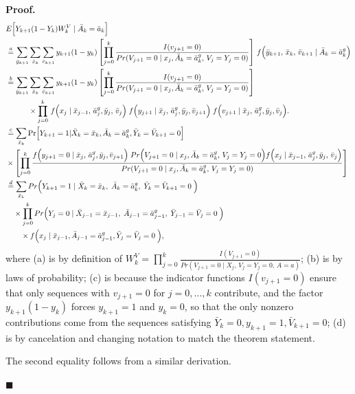 \textbf{Proof.} 
\begin{align*}
&E\Bigl[Y_{k+1}(1 - Y_k)W_k^V\mid \bar{A}_k=\bar{a}_k\Bigr] \\
&\stackrel{a}{=}\sum_{\bar{y}_{k+1}}\sum_{\bar{x}_k}\sum_{\bar{v}_{k+1}} y_{k+1}(1-y_k)
\left[\prod_{j=0}^k \frac{I(v_{j+1}=0)}{Pr(V_{j+1}=0\mid x_j,\bar{A}_k = \bar{a}^g_k, \,V_j=Y_j=0)}\right] \, f\Bigl(\bar{y}_{k+1},\,\bar{x}_k,\,\bar{v}_{k+1}\mid \bar{A}_k=\bar{a}^g_k\Bigr) \\
&\stackrel{b}{=}\sum_{\bar{y}_{k+1}}\sum_{\bar{x}_k}\sum_{\bar{v}_{k+1}} y_{k+1}(1-y_k)
\left[\prod_{j=0}^k \frac{I(v_{j+1}=0)}{Pr(V_{j+1}=0\mid x_j,\bar{A}_k = \bar{a}^g_k, \,V_j=Y_j=0)}\right] \\
& \quad \quad \quad \times  \prod_{j=0}^k \, f\Bigl(x_j\mid \bar{x}_{j-1},\, \bar{a}^g_j, \bar{y}_j,\,\bar{v}_j \Bigr) \; f\Bigl(y_{j+1}\mid \bar{x}_j,\, \bar{a}^g_j, \bar{y}_j, \bar{v}_{j+1} \Bigr) \; f\Bigl(v_{j+1}\mid \bar{x}_j,\,\bar{a}^g_j, \bar{y}_j, \bar{v}_j \Bigr). \\
&\stackrel{c}{=}\sum_{\bar{x}_k} \Pr\Bigl[ Y_{k+1}=1|\bar{X}_k=\bar{x}_k, \bar{A}_k = \bar{a}^g_k, \bar{Y}_k=\bar{V}_{k+1}=0\Bigr] \\
&\times 
\left[\prod_{j=0}^k \frac{f\Bigl(y_{j+1}=0 \mid \bar{x}_j,\, \bar{a}^g_j, \bar{y}_j, \bar{v}_{j+1} \Bigr) \; Pr\Bigr(V_{j+1}=0\mid x_j,\bar{A}_k = \bar{a}^g_k, \,V_j=Y_j=0\Bigl)f\Bigl(x_j\mid \bar{x}_{j-1},\, \bar{a}^g_j, \bar{y}_j,\,\bar{v}_j \Bigr) }{Pr(V_{j+1}=0\mid x_j,\bar{A}_k = \bar{a}^g_k, \,V_j=Y_j=0)}\right]\\
&\stackrel{d}{=}\sum_{\bar{x}_k} Pr\Bigl(Y_{k+1} = 1\mid \bar{X}_k = \bar{x}_k,\; \bar{A}_k = \bar{a}^g_k,\; \bar{Y}_k = \bar{V}_{k+1} = 0\;\Bigr) \nonumber\\
&\quad \times \prod_{j=0}^k Pr\Bigl(Y_j = 0\mid \bar{X}_{j-1} = \bar{x}_{j-1},\; \bar{A}_{j-1} = \bar{a}^g_{j-1},\; \bar{Y}_{j-1} = \bar{V}_j = 0\; \Bigr) \, \\
&\quad \quad \times f\Bigl(x_j\mid \bar{x}_{j-1}, \bar{A}_{j-1} = \bar{a}^g_{j-1}, \bar{Y}_j = \bar{V}_j = 0\; \Bigr),
\end{align*}
where (a) is by definition of $W_k^V = \prod_{j=0}^k \frac{I(V_{j+1} = 0)}{Pr(V_{j+1} = 0\mid X_j,\,V_j = Y_j = 0,\,A = a)}$; (b) is by laws of probability; (c) is because the indicator functions \(I(v_{j+1}=0)\) ensure that only sequences with \(v_{j+1}=0\) for \(j=0,\ldots,k\) contribute, and the factor \(y_{k+1}(1-y_k)\) forces \(y_{k+1}=1\) and \(y_k=0\), so that the only nonzero contributions come from the sequences satisfying $\bar{Y}_k=0,y_{k+1}=1,\bar{V}_{k+1}=0$; (d) is by cancelation and changing notation to match the theorem statement.

The second equality follows from a similar derivation. 

\(\blacksquare\)